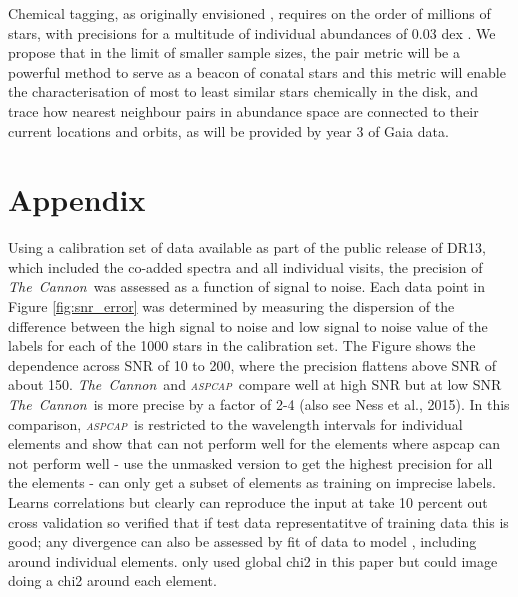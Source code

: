 \documentclass[14pt, preprint2]{aastex6}
\newcommand{\project}[1]{\textsl{#1}}
\newcommand{\tc}{\project{The~Cannon}}
\newcommand{\aspcap}{\project{\textsc{aspcap}}}
\begin{document}
Chemical tagging, as originally envisioned \citep{freeman2002}, requires on the 
order of millions of stars, with precisions for a multitude of individual 
abundances of 0.03 dex \citep{Ting2015}. We propose that in the limit of smaller sample sizes, the pair metric will be a powerful method to serve as a beacon of conatal stars and this metric will enable the characterisation of most to least similar stars chemically in the disk, and trace how nearest neighbour pairs in abundance space are connected to their current locations and orbits, as will be provided by year 3 of Gaia data. 





\pagebreak

\section{Appendix}

Using a calibration set of data available as part of the public release of DR13, which included the co-added spectra and all individual visits, the precision of \tc\ was assessed as a function of signal to noise. Each data point in Figure \ref{fig:snr_error} was determined by measuring the dispersion of the difference between the high signal to noise and low signal to noise value of the labels for each of the 1000 stars in the calibration set. The Figure shows the dependence across SNR of 10 to 200, where the precision flattens above SNR of about 150. \tc\ and \aspcap\ compare well at high SNR but at low SNR \tc\ is more precise by a factor of 2-4 (also see Ness et al., 2015). In this comparison, \aspcap\ is restricted to the wavelength intervals for individual elements and show that can not perform well for the elements where aspcap can not perform well - use the unmasked version to get the highest precision for all the elements - can only get a subset of elements as training on imprecise labels. Learns correlations but clearly can reproduce the input at take 10 percent out cross validation so verified that if test data representatitve of training data this is good; any divergence can also be assessed by fit of data to model , including around individual elements. only used global chi2 in this paper but could image doing a chi2 around each element. 
\end{document}

